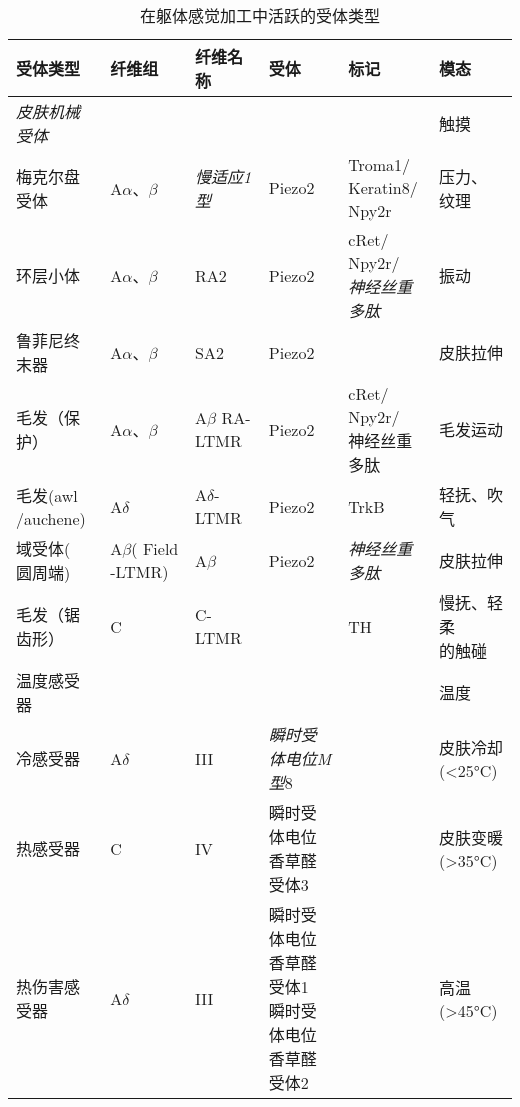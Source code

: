 \begin{table}[htbp]
	\caption{在躯体感觉加工中活跃的受体类型} \label{tab:18_2} \centering
	\begin{tabular}{llllll}
		\toprule
		受体类型 & 纤维组 & 纤维名称 & 受体 & 标记 & 模态\\
		\midrule
		\textit{皮肤机械受体} & &  &  &  & 触摸 \\
		梅克尔盘受体 & A$\alpha$、$\beta$ & \textit{慢适应1型} & Piezo2 & \makecell[l]{Troma1/\\Keratin8/\\Npy2r} & \makecell[l]{压力、\\纹理} \\
		环层小体 & A$\alpha$、$\beta$ & RA2 & Piezo2 & \makecell[l]{cRet/\\Npy2r/\\\textit{神经丝重多肽}} & 振动 \\
		鲁菲尼终末器 & A$\alpha$、$\beta$ & SA2 & Piezo2 &  & 皮肤拉伸 \\
		毛发（保护） & A$\alpha$、$\beta$ & A$\beta$ RA-LTMR & Piezo2 & \makecell[l]{cRet/\\Npy2r/\\神经丝重多肽} & 毛发运动 \\
		\makecell[l]{毛发(awl\\/auchene)} & A$\delta$ & \makecell[l]{A$\delta$-\\LTMR} & Piezo2 & TrkB & 轻抚、吹气 \\
		\makecell[l]{域受体(\\圆周端)} & \makecell[l]{A$\beta$(\\Field\\-LTMR)} & A$\beta$ & Piezo2 & \textit{神经丝重多肽} & 皮肤拉伸 \\
		毛发（锯齿形） & C & C-LTMR &  & TH & \makecell[l]{慢抚、轻柔\\的触碰} \\
		温度感受器 &  &  &  &  & 温度 \\
		冷感受器 & A$\delta$ & III & \textit{瞬时受体电位M型}8 &  & \makecell[l]{皮肤冷却\\(<25°C)} \\
		热感受器 & C & IV & \makecell[l]{瞬时受体电位\\香草醛受体3} &  & \makecell[l]{皮肤变暖\\(>35°C)} \\
		热伤害感受器 & A$\delta$ & III & \makecell[l]{瞬时受体电位\\香草醛受体1\\瞬时受体电位\\香草醛受体2} &  & 高温(>45°C) \\

\end{tabular}
\end{table}
